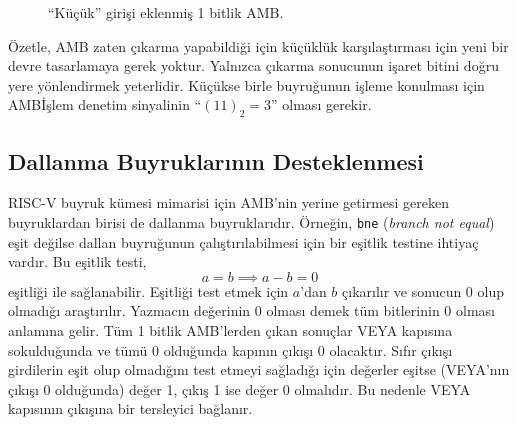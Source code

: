 \begin{figure}[htbp]
\caption[``K{\"u}{\c{c}}{\"u}k'' giri{\c{s}}i eklenmi{\c{s}} 1 bitlik AMB]{``K{\"u}{\c{c}}{\"u}k'' giri{\c{s}}i eklenmi{\c{s}} 1 bitlik AMB.}
\label{fig:1bit-amb-kucuk}
\end{figure}

Özetle, AMB zaten çıkarma yapabildiği için küçüklük karşılaştırması için yeni bir devre tasarlamaya gerek yoktur. Yalnızca çıkarma sonucunun işaret bitini doğru yere yönlendirmek yeterlidir. Küçükse birle buyruğunun işleme konulması için AMBİşlem denetim sinyalinin ``$(11)_2 = 3$'' olması gerekir.

\subsection{Dallanma Buyruklarının Desteklenmesi}

RISC-V buyruk kümesi mimarisi için AMB'nin yerine getirmesi gereken buyruklardan birisi de dallanma buyruklarıdır. Örneğin, \texttt{bne} (\emph{branch not equal}) eşit değilse dallan buyruğunun çalıştırılabilmesi için bir eşitlik testine ihtiyaç vardır. Bu eşitlik testi,
\[
a = b \implies a - b = 0
\]
eşitliği ile sağlanabilir. Eşitliği test etmek için $a$'dan $b$ çıkarılır ve sonucun 0 olup olmadığı araştırılır. Yazmacın değerinin 0 olması demek tüm bitlerinin 0 olması anlamına gelir. Tüm 1 bitlik AMB'lerden çıkan sonuçlar VEYA kapısına sokulduğunda ve tümü 0 olduğunda kapının çıkışı 0 olacaktır. Sıfır çıkışı girdilerin eşit olup olmadığını test etmeyi sağladığı için değerler eşitse (VEYA'nın çıkışı 0 olduğunda) değer 1, çıkış 1 ise değer 0 olmalıdır. Bu nedenle VEYA kapısının çıkışına bir tersleyici bağlanır.

